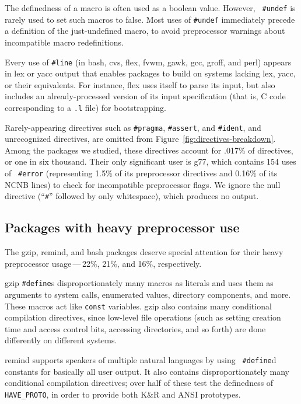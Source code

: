 \documentclass[10pt]{article}
\newcommand{\pkg}[1]{\textsf{#1}}
\begin{document}
The definedness of a macro is often used as a boolean value.  However, {\tt
\#undef} is rarely used to set such macros to false.  Most uses of
{\tt \#undef} immediately precede a definition of the just-undefined macro,
to avoid preprocessor warnings about incompatible macro redefinitions.

Every use of {\tt \#line} (in \pkg{bash}, \pkg{cvs}, \pkg{flex}, \pkg{fvwm},
\pkg{gawk}, \pkg{gcc}, \pkg{groff}, and \pkg{perl}) appears in lex or yacc
output that enables packages to build on systems lacking lex, yacc, or
their equivalents.  For instance, \pkg{flex} uses itself to parse its
input, but also includes an already-processed version of its input
specification (that is, C code corresponding to a {\tt .l} file) for
bootstrapping.


Rarely-appearing directives such as {\tt \#pragma}, {\tt \#assert}, and
{\tt \#ident}, and unrecognized directives, are omitted from
Figure~\ref{fig:directives-breakdown}.  Among the packages we studied,
these directives account for .017\% of directives, or one in six thousand.
Their only significant user is \pkg{g77}, which contains 154 uses of {\tt
\#error} (representing 1.5\% of its preprocessor directives and 0.16\% of
its NCNB lines) to check for incompatible preprocessor flags.  We ignore
the null directive (``{\tt \#}'' followed by only whitespace), which produces
no output.


\subsection{Packages with heavy preprocessor use}

The \pkg{gzip}, \pkg{remind}, and \pkg{bash} packages deserve
special attention for their heavy preprocessor usage\,---\,22\%, 21\%, and
16\%, respectively.

\pkg{gzip} {\tt \#define}s disproportionately many macros as literals and
uses them as arguments to system calls, enumerated values, directory
components, and more.  These macros act like {\tt const} variables.
\pkg{gzip} also contains many conditional compilation directives, since
low-level file operations (such as setting creation time and access control
bits, accessing directories, and so forth) are done differently on
different systems.

\pkg{remind} supports speakers of multiple natural languages by using {\tt
\#define}d constants for basically all user output.  It also contains
disproportionately many conditional compilation directives; over half of
these test the definedness of \verb|HAVE_PROTO|, in order to provide both
K\&R and ANSI prototypes.
\end{document}
